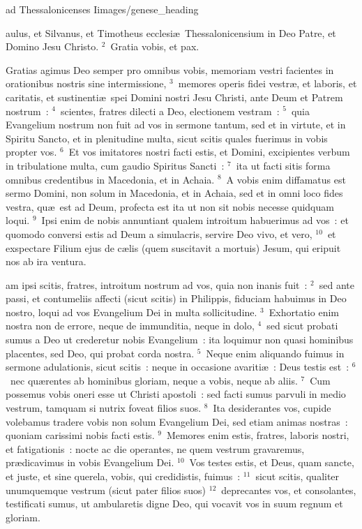{ad Thessalonicenses I}{images/genese_heading}


\bchapter
{}aulus, et Silvanus, et Timotheus ecclesi\ae\ Thessalonicensium in Deo Patre, et Domino Jesu Christo.
${}^{2}$~Gratia vobis, et pax.

 Gratias agimus Deo semper pro omnibus vobis, memoriam vestri facientes in orationibus nostris sine intermissione,
${}^{3}$~memores operis fidei vestr\ae , et laboris, et caritatis, et sustinenti\ae\ spei Domini nostri Jesu Christi, ante Deum et Patrem nostrum~:
${}^{4}$~scientes, fratres dilecti a Deo, electionem vestram~:
${}^{5}$~quia Evangelium nostrum non fuit ad vos in sermone tantum, sed et in virtute, et in Spiritu Sancto, et in plenitudine multa, sicut scitis quales fuerimus in vobis propter vos.
${}^{6}$~Et vos imitatores nostri facti estis, et Domini, excipientes verbum in tribulatione multa, cum gaudio Spiritus Sancti~:
${}^{7}$~ita ut facti sitis forma omnibus credentibus in Macedonia, et in Achaia.
${}^{8}$~A vobis enim diffamatus est sermo Domini, non solum in Macedonia, et in Achaia, sed et in omni loco fides vestra, qu\ae\ est ad Deum, profecta est ita ut non sit nobis necesse quidquam loqui.
${}^{9}$~Ipsi enim de nobis annuntiant qualem introitum habuerimus ad vos~: et quomodo conversi estis ad Deum a simulacris, servire Deo vivo, et vero,
${}^{10}$~et exspectare Filium ejus de c\ae lis (quem suscitavit a mortuis) Jesum, qui eripuit nos ab ira ventura.

\bchapter
{}am ipsi scitis, fratres, introitum nostrum ad vos, quia non inanis fuit~:
${}^{2}$~sed ante passi, et contumeliis affecti (sicut scitis) in Philippis, fiduciam habuimus in Deo nostro, loqui ad vos Evangelium Dei in multa sollicitudine.
${}^{3}$~Exhortatio enim nostra non de errore, neque de immunditia, neque in dolo,
${}^{4}$~sed sicut probati sumus a Deo ut crederetur nobis Evangelium~: ita loquimur non quasi hominibus placentes, sed Deo, qui probat corda nostra.
${}^{5}$~Neque enim aliquando fuimus in sermone adulationis, sicut scitis~: neque in occasione avariti\ae~: Deus testis est~:
${}^{6}$~nec qu\ae rentes ab hominibus gloriam, neque a vobis, neque ab aliis.
${}^{7}$~Cum possemus vobis oneri esse ut Christi apostoli~: sed facti sumus parvuli in medio vestrum, tamquam si nutrix foveat filios suos.
${}^{8}$~Ita desiderantes vos, cupide volebamus tradere vobis non solum Evangelium Dei, sed etiam animas nostras~: quoniam carissimi nobis facti estis.
${}^{9}$~Memores enim estis, fratres, laboris nostri, et fatigationis~: nocte ac die operantes, ne quem vestrum gravaremus, pr\ae dicavimus in vobis Evangelium Dei.
${}^{10}$~Vos testes estis, et Deus, quam sancte, et juste, et sine querela, vobis, qui credidistis, fuimus~:
${}^{11}$~sicut scitis, qualiter unumquemque vestrum (sicut pater filios suos)
${}^{12}$~deprecantes vos, et consolantes, testificati sumus, ut ambularetis digne Deo, qui vocavit vos in suum regnum et gloriam.



